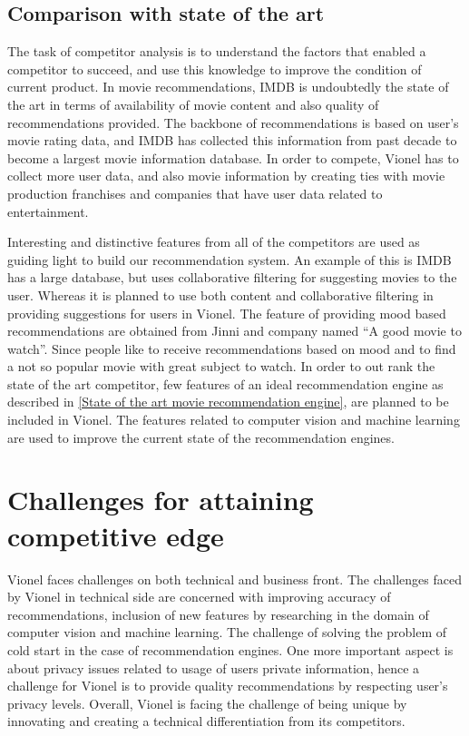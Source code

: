  \subsection{Comparison with state of the art}
 \label{Comparision_with_state_of_the_art}
 The task of competitor analysis is to understand the factors that enabled a competitor to succeed, and use this knowledge to improve the condition of current product. In movie recommendations, \acrshort{IMDB} is undoubtedly the state of the art in terms of availability of movie content and also quality of recommendations provided. The backbone of recommendations is based on user's movie rating data, and \acrshort{IMDB} has collected this information from past decade to become a largest movie information database. In order to compete, Vionel has to collect more user data, and also movie information by creating ties with movie production franchises and companies that have user data related to entertainment. 

 Interesting and distinctive features from all of the competitors are used as guiding light to build our recommendation system. An example of this is \acrshort{IMDB} has a large database, but uses collaborative filtering for suggesting movies to the user. Whereas it is planned to use both content and collaborative filtering in providing suggestions for users in Vionel. The feature of providing mood based recommendations are obtained from Jinni and company named ``A good movie to watch''. Since people like to receive recommendations based on mood and to find a not so popular movie with great subject to watch. In order to out rank the state of the art competitor, few features of an ideal recommendation engine as described in \ref{State of the art movie recommendation engine}, are planned to be included in Vionel. The features related to computer vision and machine learning are used to improve the current state of the recommendation engines. 
 
\section{Challenges for attaining competitive edge}
  Vionel faces challenges on both technical and business front. The challenges faced by Vionel in technical side are concerned with improving accuracy of recommendations, inclusion of new features by researching in the domain of computer vision and machine learning. The challenge of solving the problem of cold start in the case of recommendation engines. One more important aspect is about privacy issues related to usage of users private information, hence a challenge for Vionel is to provide quality recommendations by respecting user's privacy levels. Overall, Vionel is facing the challenge of being unique by innovating and creating a technical differentiation from its competitors.


